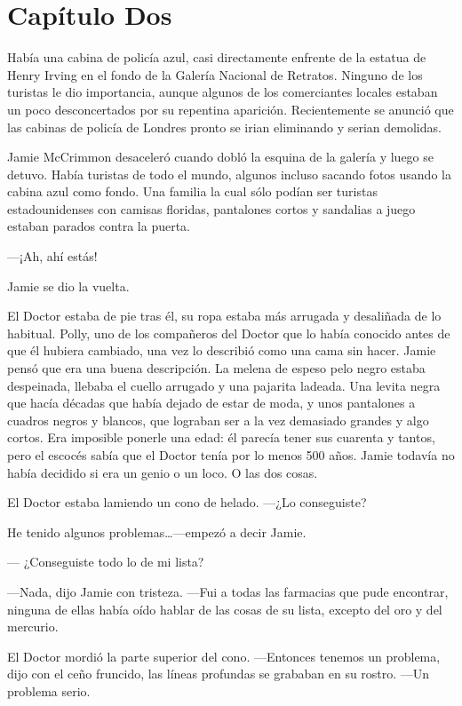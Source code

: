 \chapter*{Capítulo Dos}

Había una cabina de policía azul, casi directamente enfrente de la
estatua de Henry Irving en el fondo de la Galería Nacional de Retratos.
Ninguno de los turistas le dio importancia, aunque algunos de los
comerciantes locales estaban un poco desconcertados por su repentina
aparición. Recientemente se anunció que las cabinas de policía de
Londres pronto se irian eliminando y serian demolidas.

Jamie McCrimmon desaceleró cuando dobló la esquina de la galería y luego
se detuvo. Había turistas de todo el mundo, algunos incluso sacando
fotos usando la cabina azul como fondo. Una familia la cual sólo podían
ser turistas estadounidenses con camisas floridas, pantalones cortos y
sandalias a juego estaban parados contra la puerta.

---¡Ah, ahí estás!

Jamie se dio la vuelta.

El Doctor estaba de pie tras él, su ropa estaba más arrugada y
desaliñada de lo habitual. Polly, uno de los compañeros del Doctor que
lo había conocido antes de que él hubiera  cambiado, una vez lo
describió como una cama sin hacer. Jamie pensó que era una buena
descripción. La melena de espeso pelo negro estaba despeinada, llebaba
el  cuello arrugado y una pajarita ladeada. Una levita negra que hacía
décadas que había dejado de estar de moda, y unos pantalones a cuadros
negros y blancos, que lograban ser a la vez demasiado grandes y algo
cortos. Era imposible ponerle una edad: él parecía tener sus cuarenta y
tantos, pero el escocés sabía que el Doctor tenía por lo menos 500 años.
Jamie todavía no había decidido si era un genio o un loco. O las dos
cosas.

El Doctor estaba lamiendo un cono de helado. ---¿Lo conseguiste?

He tenido algunos problemas\ldots{}---empezó a decir Jamie.

--- ¿Conseguiste todo lo de mi lista?

---Nada, dijo Jamie con tristeza. ---Fui a todas las farmacias que pude
encontrar, ninguna de ellas había oído hablar de las cosas de su lista,
excepto del oro y del mercurio.

El Doctor mordió la parte superior del cono. ---Entonces tenemos un
problema, dijo con el ceño fruncido, las líneas profundas se grababan en
su rostro. ---Un problema serio.

